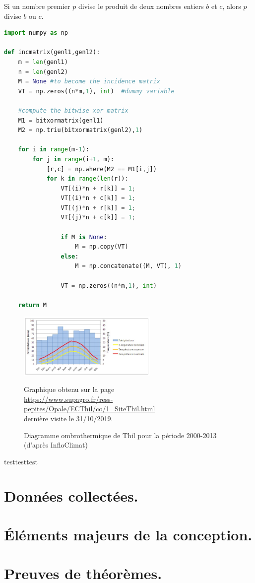 \documentclass[francais]{rapportPFE}  %
\begin{document}
\begin{Lemma}
\label{lem:Euclide}
Si un nombre premier $p$ divise le produit de deux nombres entiers $b$ et $c$, alors $p$ divise $b$ ou $c$.
\end{Lemma}



%
\begin{lstlisting}[language=Python,caption={Programme inconnu},label=lst:Inconnu]
import numpy as np
 
def incmatrix(genl1,genl2):
    m = len(genl1)
    n = len(genl2)
    M = None #to become the incidence matrix
    VT = np.zeros((n*m,1), int)  #dummy variable
 
    #compute the bitwise xor matrix
    M1 = bitxormatrix(genl1)
    M2 = np.triu(bitxormatrix(genl2),1) 
 
    for i in range(m-1):
        for j in range(i+1, m):
            [r,c] = np.where(M2 == M1[i,j])
            for k in range(len(r)):
                VT[(i)*n + r[k]] = 1;
                VT[(i)*n + c[k]] = 1;
                VT[(j)*n + r[k]] = 1;
                VT[(j)*n + c[k]] = 1;
 
                if M is None:
                    M = np.copy(VT)
                else:
                    M = np.concatenate((M, VT), 1)
 
                VT = np.zeros((n*m,1), int)
 
    return M
\end{lstlisting}

\begin{figure}[!t]
\centering
\includegraphics[width=0.6\textwidth]{graphics/DiagrammeThil.jpg}
\begin{tiny}

Graphique obtenu sur la page\\
\url{https://www.supagro.fr/ress-pepites/Opale/ECThil/co/1_SiteThil.html}\\
dernière visite le 31/10/2019.
\end{tiny}
\caption{Diagramme ombrothermique de Thil pour la période 2000-2013 (d'après InfloClimat)}
\label{fig:Expe}
\end{figure}




testtesttest


\appendix
\section{Données collectées.}


\section{Éléments majeurs de la conception.}

\section{Preuves de théorèmes.}
\end{document}
